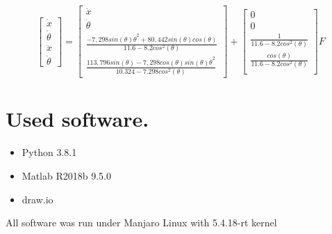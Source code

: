 \documentclass[a4paper,12pt]{article}
\begin{document}
    \begin{equation}
        \begin{bmatrix}
            \dot x\\
            \dot \theta\\
            \ddot x\\
            \ddot \theta    
        \end{bmatrix}
        =
        \begin{bmatrix}
            \dot x\\
            \dot \theta\\
            \frac
            {- 7,298sin(\theta)\dot \theta^2 + 80,442sin(\theta)cos(\theta)}
            {11.6 - 8.2cos^2(\theta)}\\
            \frac
            {113,796sin(\theta) - 7,298cos(\theta)sin(\theta)\dot \theta^2}
            {10.324 - 7.298cos^2(\theta)}
        \end{bmatrix}
        +
        \begin{bmatrix}
            0\\0\\
            \frac{1}
            {11.6 - 8.2cos^2(\theta)}\\
            \frac{cos(\theta)}
            {11.6 - 8.2cos^2(\theta)}\\
        \end{bmatrix}
        F
    \end{equation}
\section{Used software.}
\begin{itemize}
    \item Python 3.8.1
    \item Matlab R2018b 9.5.0
    \item draw.io
\end{itemize}
All software was run under Manjaro Linux with 5.4.18-rt kernel
\end{document}
